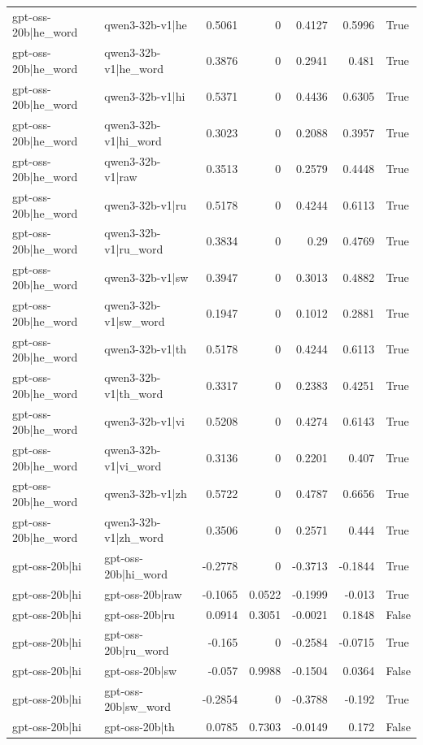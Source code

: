 \begin{table}
\begin{tabular}{l l r r r r l}
gpt-oss-20b|he_word & qwen3-32b-v1|he & 0.5061 & 0 & 0.4127 & 0.5996 & True \\
gpt-oss-20b|he_word & qwen3-32b-v1|he_word & 0.3876 & 0 & 0.2941 & 0.481 & True \\
gpt-oss-20b|he_word & qwen3-32b-v1|hi & 0.5371 & 0 & 0.4436 & 0.6305 & True \\
gpt-oss-20b|he_word & qwen3-32b-v1|hi_word & 0.3023 & 0 & 0.2088 & 0.3957 & True \\
gpt-oss-20b|he_word & qwen3-32b-v1|raw & 0.3513 & 0 & 0.2579 & 0.4448 & True \\
gpt-oss-20b|he_word & qwen3-32b-v1|ru & 0.5178 & 0 & 0.4244 & 0.6113 & True \\
gpt-oss-20b|he_word & qwen3-32b-v1|ru_word & 0.3834 & 0 & 0.29 & 0.4769 & True \\
gpt-oss-20b|he_word & qwen3-32b-v1|sw & 0.3947 & 0 & 0.3013 & 0.4882 & True \\
gpt-oss-20b|he_word & qwen3-32b-v1|sw_word & 0.1947 & 0 & 0.1012 & 0.2881 & True \\
gpt-oss-20b|he_word & qwen3-32b-v1|th & 0.5178 & 0 & 0.4244 & 0.6113 & True \\
gpt-oss-20b|he_word & qwen3-32b-v1|th_word & 0.3317 & 0 & 0.2383 & 0.4251 & True \\
gpt-oss-20b|he_word & qwen3-32b-v1|vi & 0.5208 & 0 & 0.4274 & 0.6143 & True \\
gpt-oss-20b|he_word & qwen3-32b-v1|vi_word & 0.3136 & 0 & 0.2201 & 0.407 & True \\
gpt-oss-20b|he_word & qwen3-32b-v1|zh & 0.5722 & 0 & 0.4787 & 0.6656 & True \\
gpt-oss-20b|he_word & qwen3-32b-v1|zh_word & 0.3506 & 0 & 0.2571 & 0.444 & True \\
gpt-oss-20b|hi & gpt-oss-20b|hi_word & -0.2778 & 0 & -0.3713 & -0.1844 & True \\
gpt-oss-20b|hi & gpt-oss-20b|raw & -0.1065 & 0.0522 & -0.1999 & -0.013 & True \\
gpt-oss-20b|hi & gpt-oss-20b|ru & 0.0914 & 0.3051 & -0.0021 & 0.1848 & False \\
gpt-oss-20b|hi & gpt-oss-20b|ru_word & -0.165 & 0 & -0.2584 & -0.0715 & True \\
gpt-oss-20b|hi & gpt-oss-20b|sw & -0.057 & 0.9988 & -0.1504 & 0.0364 & False \\
gpt-oss-20b|hi & gpt-oss-20b|sw_word & -0.2854 & 0 & -0.3788 & -0.192 & True \\
gpt-oss-20b|hi & gpt-oss-20b|th & 0.0785 & 0.7303 & -0.0149 & 0.172 & False \\

\end{tabular}
\end{table}
